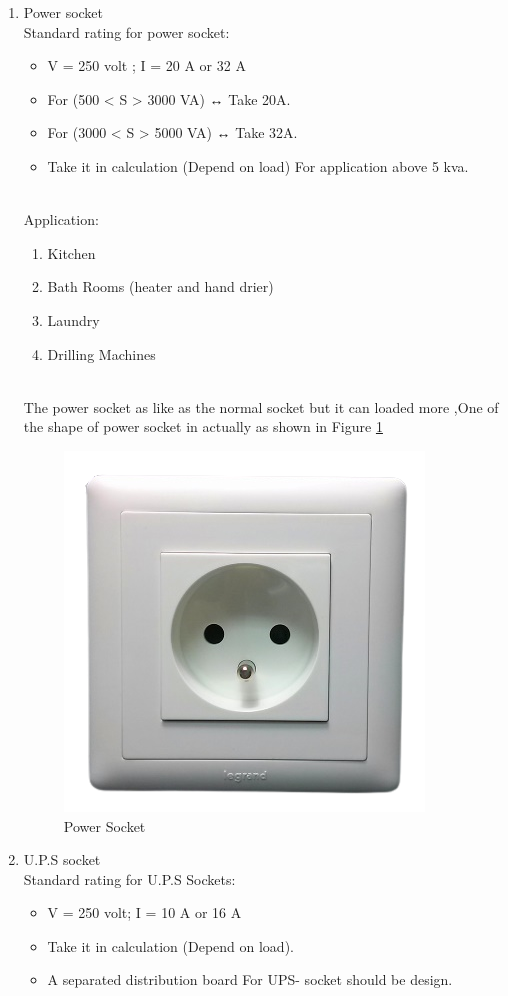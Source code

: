 \documentclass[12pt,fleqn]{book} %
\begin{document}
\begin{enumerate}
    
    \item  Power socket
    \\Standard rating for power socket:
    \begin{itemize}
        \item V = 250 volt ;  I = 20 A or 32 A
         \item For (500 < S > 3000 VA) ↔ Take 20A.
 \item For (3000 < S > 5000 VA) ↔ Take 32A.
 \item Take it in calculation (Depend on load) For application above 5 kva.
    \end{itemize}
    \\Application:
    \begin{enumerate}
        \item Kitchen 
        \item Bath Rooms (heater and hand drier)
        \item Laundry
        \item Drilling Machines
  
    \end{enumerate}
    \\The power socket as like as the normal socket but it can loaded more ,One of the shape of power socket in actually as shown in  Figure \ref{fig:s 3}
    \begin{figure}[h!]
    \centering
    \includegraphics[width=0.4\linewidth]{s 3.png}
    \caption{   Power Socket  }
    \label{fig:s 3}
\end{figure}


    \item U.P.S socket
    \\ Standard rating for U.P.S Sockets: 
    \begin{itemize}
        \item  V = 250 volt; I = 10 A or 16 A
        \item Take it in calculation (Depend on load).  \item A separated distribution board For UPS- socket should be design.


\end{itemize}
\end{enumerate}
\end{document}

